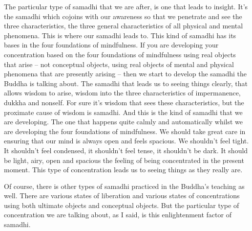\documentclass[letterpaper,10pt,english]{sphinxmanual}
\begin{document}
\sphinxAtStartPar
The particular type of samadhi that we are after, is one that leads to
insight. It’s the samadhi which co\sphinxhyphen{}joins with our awareness so that we penetrate and  see  the  three characteristics, the three general characteristics of
all  physical  and  mental  phenomena.  This  is  where  our  samadhi  leads  to.
This kind of samadhi has its bases in the four foundations of mindfulness.
If you are developing your concentration based on the four foundations of
mindfulness using real objects that arise – not conceptual objects, using real
objects of mental and physical phenomena that are presently arising – then
we start to develop the samadhi the Buddha is talking about. The samadhi
that leads us to seeing things clearly, that allows wisdom to arise, wisdom
into  the  three  characteristics  of  impermanence,  dukkha  and  non\sphinxhyphen{}self.  For
sure it’s wisdom that sees these characteristics, but the proximate cause of
wisdom is samadhi. And this is the kind of samadhi that we are developing.
The one that happens quite calmly and automatically whilst we are developing the four foundations of mindfulness. We should take great care in ensuring that our mind is always open and feels spacious. We shouldn’t feel tight.
It shouldn’t feel condensed, it shouldn’t feel tense, it shouldn’t be dark. It
should be light, airy, open and spacious the feeling of being concentrated in
the present moment. This type of concentration leads us to seeing things as
they really are.

\sphinxAtStartPar
Of course, there is other types of samadhi practiced in the Buddha’s
teaching  as  well.  There  are  various  states  of  liberation  and  various  states
of  concentrations  using  both  ultimate  objects  and  conceptual  objects.  But
the  particular  type  of  concentration  we  are  talking  about,  as  I  said,  is  this
enlightenment factor of samadhi.
\end{document}
